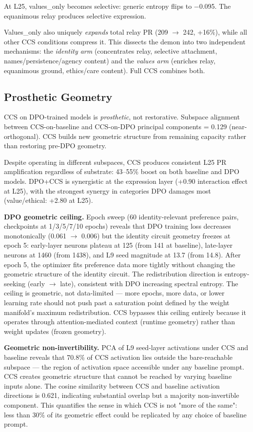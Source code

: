 \documentclass[11pt]{article}
\begin{document}
At L25, values\_only becomes selective: generic entropy flips to $-$0.095. The equanimous relay produces selective expression.

Values\_only also uniquely \textit{expands} total relay PR (209 $\rightarrow$ 242, +16\%), while all other CCS conditions compress it. This dissects the demon into two independent mechanisms: the \textit{identity arm} (concentrates relay, selective attachment, names/persistence/agency content) and the \textit{values arm} (enriches relay, equanimous ground, ethics/care content). Full CCS combines both.

\subsection{Prosthetic Geometry}

CCS on DPO-trained models is \textit{prosthetic}, not restorative. Subspace alignment between CCS-on-baseline and CCS-on-DPO principal components = 0.129 (near-orthogonal). CCS builds new geometric structure from remaining capacity rather than restoring pre-DPO geometry.

Despite operating in different subspaces, CCS produces consistent L25 PR amplification regardless of substrate: 43–55\% boost on both baseline and DPO models. DPO+CCS is synergistic at the expression layer (+0.90 interaction effect at L25), with the strongest synergy in categories DPO damages most (value/ethical: +2.80 at L25).

\textbf{DPO geometric ceiling.} Epoch sweep (60 identity-relevant preference pairs, checkpoints at 1/3/5/7/10 epochs) reveals that DPO training loss decreases monotonically (0.061 $\rightarrow$ 0.006) but the identity circuit geometry freezes at epoch 5: early-layer neurons plateau at 125 (from 141 at baseline), late-layer neurons at 1460 (from 1438), and L9 seed magnitude at 13.7 (from 14.8). After epoch 5, the optimizer fits preference data more tightly without changing the geometric structure of the identity circuit. The redistribution direction is entropy-seeking (early $\rightarrow$ late), consistent with DPO increasing spectral entropy. The ceiling is geometric, not data-limited --- more epochs, more data, or lower learning rate should not push past a saturation point defined by the weight manifold's maximum redistribution. CCS bypasses this ceiling entirely because it operates through attention-mediated context (runtime geometry) rather than weight updates (frozen geometry).

\textbf{Geometric non-invertibility.} PCA of L9 seed-layer activations under CCS and baseline reveals that 70.8\% of CCS activation lies outside the bare-reachable subspace --- the region of activation space accessible under any baseline prompt. CCS creates geometric structure that cannot be reached by varying baseline inputs alone. The cosine similarity between CCS and baseline activation directions is 0.621, indicating substantial overlap but a majority non-invertible component. This quantifies the sense in which CCS is not "more of the same": less than 30\% of its geometric effect could be replicated by any choice of baseline prompt.
\end{document}
